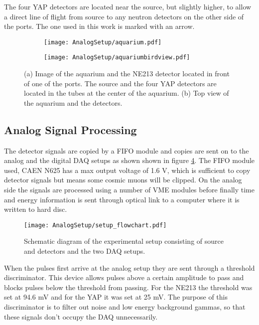 \documentclass[main.tex]{subfiles}
\begin{document}
The four YAP detectors are located near the source, but slightly higher, to allow a direct line of flight from source to any neutron detectors on the other side of the ports. The one used in this work is marked with an arrow.
\begin{figure}[ht]
	\center
	\begin{subfigure}[b]{0.49\textwidth}
	    \centering
    	    \texttt{[image: AnalogSetup/aquarium.pdf]}
        	\caption{}
	    \label{fig:aquarium_pers} 
	\end{subfigure}
	\begin{subfigure}[b]{0.49\textwidth}
	    \centering
    	    \texttt{[image: AnalogSetup/aquariumbirdview.pdf]}
        	\caption{}
	    \label{fig:aquarium_bird} 
	\end{subfigure}
	\caption{(a) Image of the aquarium and the NE213 detector located in front of one of the ports. The source and the four YAP detectors are located in the tubes at the center of the aquarium. (b) Top view of the aquarium and the detectors.}
	\label{fig:aquarium}
\end{figure}

\subsection{Analog Signal Processing}
The detector signals are copied by a FIFO module and copies are sent on to the analog and the digital DAQ setups as shown shown in figure \ref{fig:setup}. The FIFO module used, CAEN N625 has a max output voltage of 1.6 V, which is sufficient to copy detector signals but means some cosmic muons will be clipped.  On the analog side the signals are processed using a number of VME modules before finally time and energy information is sent through optical link to a computer where it is written to hard disc. 

\begin{figure}[h]
    \centering
        \texttt{[image: AnalogSetup/setup\_flowchart.pdf]}
        \caption{Schematic diagram of the experimental setup consisting of source and detectors and the two DAQ setups.}
    \label{fig:setup}
\end{figure}

When the pulses first arrive at the analog setup they are sent through a threshold discriminator. This device allows pulses above a certain amplitude to pass and blocks pulses below the threshold from passing. For the NE213 the threshold was set at 94.6 mV and for the YAP it was set at 25 mV. The purpose of this discriminator is to filter out noise and low energy background gammas, so that these signals don't occupy the DAQ unnecessarily.
\end{document}
